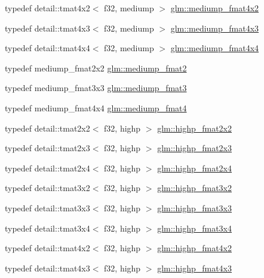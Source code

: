 \begin{DoxyCompactItemize}
\item 
typedef detail\+::tmat4x2$<$ f32, mediump $>$ \hyperlink{group__gtc__type__precision_ga09a2851d38fe3cf52735a1d26199bdcc}{glm\+::mediump\+\_\+fmat4x2}
\item 
typedef detail\+::tmat4x3$<$ f32, mediump $>$ \hyperlink{group__gtc__type__precision_ga5e5de428d1e1da2c593a6245d92dd8c0}{glm\+::mediump\+\_\+fmat4x3}
\item 
typedef detail\+::tmat4x4$<$ f32, mediump $>$ \hyperlink{group__gtc__type__precision_ga7f4ae9d05ca94005a0b7d8e3c59943cd}{glm\+::mediump\+\_\+fmat4x4}
\item 
typedef mediump\+\_\+fmat2x2 \hyperlink{group__gtc__type__precision_ga5b9de77ef7403ffc972700219eca5450}{glm\+::mediump\+\_\+fmat2}
\item 
typedef mediump\+\_\+fmat3x3 \hyperlink{group__gtc__type__precision_ga85f2267401434ea8c5463af040f0760c}{glm\+::mediump\+\_\+fmat3}
\item 
typedef mediump\+\_\+fmat4x4 \hyperlink{group__gtc__type__precision_ga6cd3ae1f3509b79061edcc83564769d4}{glm\+::mediump\+\_\+fmat4}
\item 
typedef detail\+::tmat2x2$<$ f32, highp $>$ \hyperlink{group__gtc__type__precision_gaeb76f1230ecfd4c80635d3c618405e31}{glm\+::highp\+\_\+fmat2x2}
\item 
typedef detail\+::tmat2x3$<$ f32, highp $>$ \hyperlink{group__gtc__type__precision_ga53c126d1650b460bc7496a6fd5e5e764}{glm\+::highp\+\_\+fmat2x3}
\item 
typedef detail\+::tmat2x4$<$ f32, highp $>$ \hyperlink{group__gtc__type__precision_ga5df8430c47272adc901ef224d85a9c4d}{glm\+::highp\+\_\+fmat2x4}
\item 
typedef detail\+::tmat3x2$<$ f32, highp $>$ \hyperlink{group__gtc__type__precision_gad5c083691eb15539fd81e27e1dc6b813}{glm\+::highp\+\_\+fmat3x2}
\item 
typedef detail\+::tmat3x3$<$ f32, highp $>$ \hyperlink{group__gtc__type__precision_gaf1d697243b1de74a5769c49e68b1e2a6}{glm\+::highp\+\_\+fmat3x3}
\item 
typedef detail\+::tmat3x4$<$ f32, highp $>$ \hyperlink{group__gtc__type__precision_ga1f377a3da21dd6c418ec3a5119a4514a}{glm\+::highp\+\_\+fmat3x4}
\item 
typedef detail\+::tmat4x2$<$ f32, highp $>$ \hyperlink{group__gtc__type__precision_gab3d688f05a884be93c647bce2d8a46f4}{glm\+::highp\+\_\+fmat4x2}
\item 
typedef detail\+::tmat4x3$<$ f32, highp $>$ \hyperlink{group__gtc__type__precision_ga07f7578fc5a4dd8cdd8a532db25d535f}{glm\+::highp\+\_\+fmat4x3}

\end{DoxyCompactItemize}
